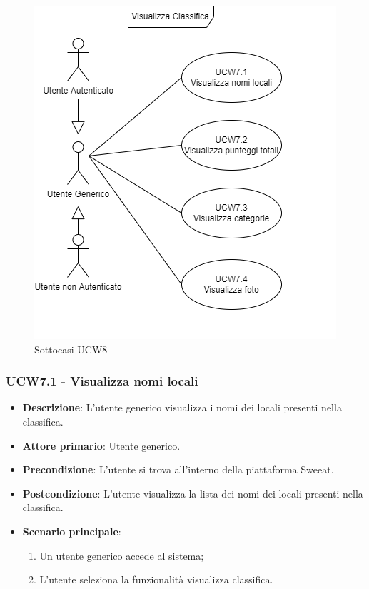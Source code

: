 \begin{figure}[!h]
    \centering
        \includegraphics[scale=0.5]{UC_images/UCW7-1.png}
        \caption{Sottocasi UCW8}
\end{figure}

\subsubsection{UCW7.1 - Visualizza nomi locali}
\begin{itemize}
	\item \textbf{Descrizione}: L'utente generico visualizza i nomi dei locali presenti nella classifica.
    \item \textbf{Attore primario}: Utente generico.
    \item \textbf{Precondizione}: L’utente si trova all’interno della piattaforma Sweeat.
    \item \textbf{Postcondizione}: L’utente visualizza la lista dei nomi dei locali presenti nella classifica.
    \item \textbf{Scenario principale}: 
    \begin{enumerate}
        \item Un utente generico accede al sistema;
        \item L’utente seleziona la funzionalità visualizza classifica.
    \end{enumerate}
\end{itemize}

